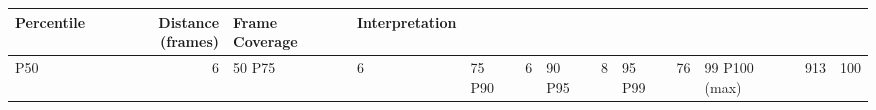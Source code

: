 \begin{tabular}{lrll}
\toprule
Percentile & Distance (frames) & Frame Coverage & Interpretation \\
\midrule
P50 & 6 & 50%
P75 & 6 & 75%
P90 & 6 & 90%
P95 & 8 & 95%
P99 & 76 & 99%
P100 (max) & 913 & 100%
\bottomrule
\end{tabular}
